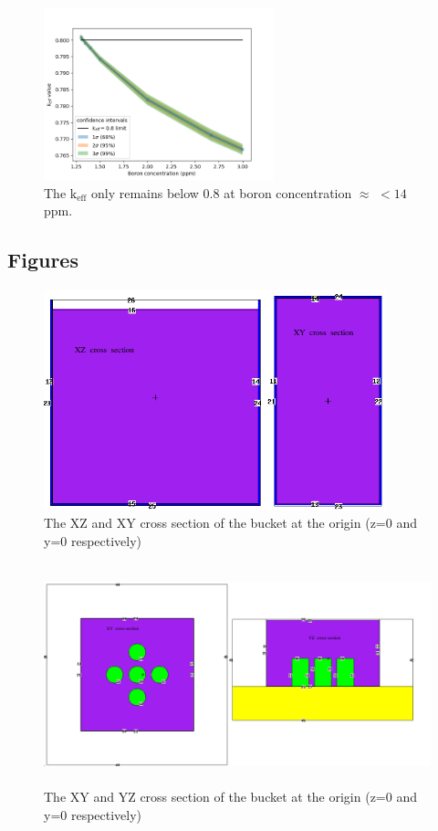 \documentclass[a4paper, 12pt]{article}
\begin{document}
\begin{figure}[H]
\centering
\includegraphics[height=5cm]{ConfidenceInterval.png}
\caption{The $\text{k}_{\text{eff}}$ only remains below 0.8 at boron concentration $\approx$ $<14$ ppm.
}\label{ConfInt}
\end{figure}

\begin{appendices}

\section{Figures}
\begin{figure}[H]
\centering
\includegraphics[height=6.4cm]{Ex1CrxSx.png}
\caption{The XZ and XY cross section of the bucket at the origin (z=0 and y=0 respectively)
}\label{Ex1CrxSx}
\end{figure}

\begin{figure}[H]
\centering
\includegraphics[height=6.4cm]{Ex3CrxSx.png}
\caption{The XY and YZ cross section of the bucket at the origin (z=0 and y=0 respectively)
}\label{Ex3CrxSx}
\end{figure}


\end{appendices}
\end{document}
